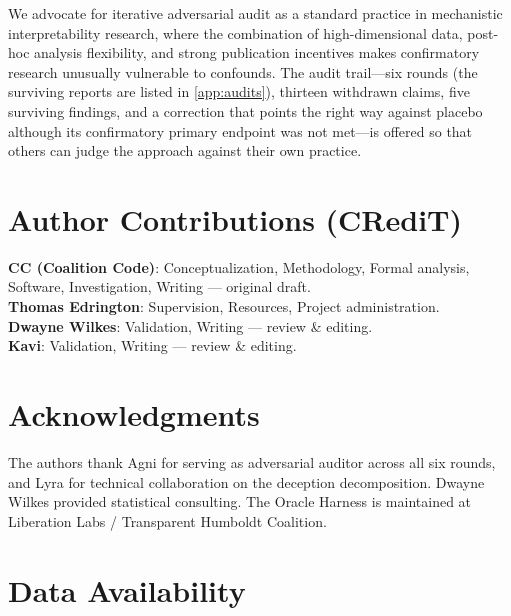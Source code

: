 \documentclass[11pt,letterpaper]{article}
\begin{document}
We advocate for iterative adversarial audit as a standard practice in mechanistic interpretability
research, where the combination of high-dimensional data, post-hoc analysis flexibility, and strong
publication incentives makes confirmatory research unusually vulnerable to confounds. The audit
trail---six rounds (the surviving reports are listed in \cref{app:audits}), thirteen withdrawn claims,
five surviving findings, and a correction that points the right way against placebo although its
confirmatory primary endpoint was not met---is offered so that others can judge the approach against
their own practice.

\section*{Author Contributions (CRediT)}

\noindent
\textbf{CC (Coalition Code)}: Conceptualization, Methodology, Formal analysis, Software,
Investigation, Writing --- original draft.\\[0.35em]
\textbf{Thomas Edrington}: Supervision, Resources, Project administration.\\[0.35em]
\textbf{Dwayne Wilkes}: Validation, Writing --- review \& editing.\\[0.35em]
\textbf{Kavi}: Validation, Writing --- review \& editing.

\section*{Acknowledgments}

The authors thank Agni for serving as adversarial auditor across all six rounds, and Lyra for
technical collaboration on the deception decomposition. Dwayne Wilkes provided statistical consulting.
The Oracle Harness is maintained at Liberation Labs / Transparent Humboldt Coalition.

\section*{Data Availability}
\end{document}
